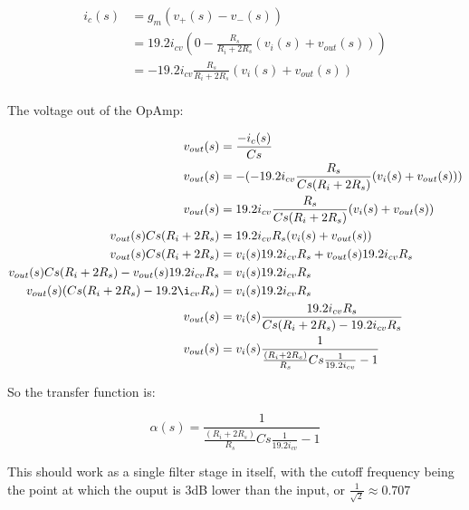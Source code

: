 \documentclass{article}
\begin{document}
\begin{equation*}
\begin{split}
  i_c(s) & = g_m(v_+(s) - v_-(s)) \\
   & = 19.2i_{cv}(0 - \frac{R_s}{{R_i} + 2{R_s}}(v_i(s) + v_{out}(s))) \\
   & = -19.2i_{cv}\frac{R_s}{{R_i} + 2{R_s}}(v_i(s) + v_{out}(s)) \\
\end{split}
\end{equation*}

The voltage out of the OpAmp:

\begin{equation*}
\begin{split}
  v_{out}(s) & = \frac{-i_c(s)}{Cs} \\
  v_{out}(s) & = -(-19.2i_{cv}\frac{R_s}{Cs({R_i} + 2{R_s})}(v_i(s) + v_{out}(s))) \\
  v_{out}(s) & = 19.2i_{cv}\frac{R_s}{Cs({R_i} + 2{R_s})}(v_i(s) + v_{out}(s)) \\
  v_{out}(s)Cs({R_i} + 2{R_s}) & = 19.2i_{cv}R_s(v_i(s) + v_{out}(s)) \\
  v_{out}(s)Cs({R_i} + 2{R_s}) & = v_i(s)19.2i_{cv}R_s + v_{out}(s)19.2i_{cv}R_s \\
  v_{out}(s)Cs({R_i} + 2{R_s}) - v_{out}(s)19.2i_{cv}R_s & = v_i(s)19.2i_{cv}R_s \\
  v_{out}(s)(Cs({R_i} + 2{R_s}) - 19.2\i_{cv}R_s) & = v_i(s)19.2i_{cv}R_s \\
  v_{out}(s) & = v_i(s)\frac{19.2i_{cv}R_s}{Cs({R_i} + 2{R_s}) - 19.2i_{cv}R_s} \\
  v_{out}(s) & = v_i(s)\frac{1}{\frac{({R_i} + 2{R_s})}{R_s}Cs\frac{1}{19.2i_{cv}} - 1} \\
\end{split}
\end{equation*}

So the transfer function is:

\begin{equation}
  \alpha(s) = \frac{1}{\frac{({R_i} + 2{R_s})}{R_s}Cs\frac{1}{19.2i_{cv}} - 1}
\end{equation}

This should work as a single filter stage in itself, with the cutoff frequency being the point at which the ouput is 3dB lower than the input, or $\frac{1}{\sqrt{2}} \approx 0.707$
\end{document}
